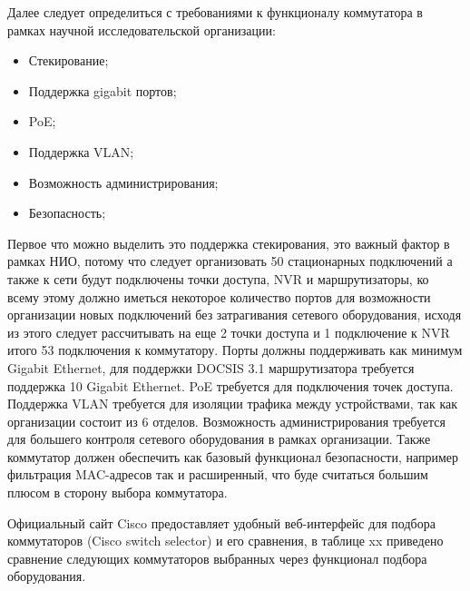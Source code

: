 Далее следует определиться с требованиями к функционалу коммутатора 
в рамках научной исследовательской организации:

\begin{itemize}
    \item Стекирование;
    \item Поддержка gigabit портов;
    \item PoE;    
    \item Поддержка VLAN;    
    \item Возможность администрирования;    
    \item Безопасность;
\end{itemize}

Первое что можно выделить это поддержка стекирования, это важный фактор в рамках НИО, потому что следует организовать 50 стационарных подключений
а также к сети будут подключены точки доступа, NVR и маршрутизаторы, ко всему этому должно иметься некоторое количество портов для возможности
организации новых подключений без затрагивания сетевого оборудования, исходя из этого следует рассчитывать на еще 2 точки доступа и 1 подключение к NVR итого 53 подключения к коммутатору.
Порты должны поддерживать как минимум Gigabit Ethernet, для поддержки DOCSIS 3.1 маршрутизатора требуется поддержка 10 Gigabit Ethernet. PoE требуется для подключения точек доступа. 
Поддержка VLAN требуется для изоляции трафика между устройствами, так как организации состоит из 6 отделов.
Возможность администрирования требуется для большего контроля сетевого оборудования в рамках организации.
Также коммутатор должен обеспечить как базовый функционал безопасности, например фильтрация MAC-адресов так и расширенный, что буде считаться большим плюсом в сторону
выбора коммутатора.

Официальный сайт Cisco предоставляет удобный веб-интерфейс для подбора коммутаторов (Cisco switch selector) и его сравнения, в таблице xx приведено сравнение следующих коммутаторов 
выбранных через функционал подбора оборудования.

